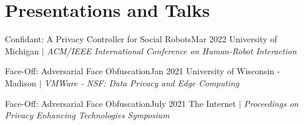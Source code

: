 \section{Presentations and Talks}
  \CVSubHeadingListStart
    \CVSubheading
      {{Confidant: A Privacy Controller for Social Robots}\cite{HRIPrivacy}}{Mar 2022}
      {{University of Michigan} $|$ \emph{\small{ACM/IEEE International Conference on Human-Robot Interaction}}}{}

    \CVSubheading
      {{Face-Off: Adversarial Face Obfuscation}\cite{FaceOff}}{Jan 2021}
      {{University of Wisconsin - Madison} $|$ \emph{\small{VMWare - NSF: Data Privacy and Edge Computing}}}{}
      
    \CVSubheading
      {{Face-Off: Adversarial Face Obfuscation}\cite{FaceOff}}{July 2021}
      {{The Internet} $|$ \emph{\small{Proceedings on Privacy Enhancing Technologies Symposium}}}{}
  \CVSubHeadingListEnd
